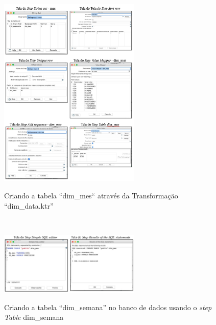 \begin{figure}[H]
	\vspace*{0,2cm}
    \centering
    \caption{Criando a tabela ``dim\_mes`` atrav\'{e}s da Transforma\c{c}\~{a}o ``dim\_data.ktr''}
    \includegraphics[width=0.6\textwidth]{./04-figuras/figura-dim-mes}
    \label{fig:ilustfigdimmes}
\end{figure}
\vspace*{-0,9cm}
{\raggedright {}} \\

\begin{figure}[H]
	\vspace*{0,2cm}
    \centering
    \caption{Criando a tabela ``dim\_semana'' no banco de dados usando o \textit{step Table} dim\_semana}
    \includegraphics[width=0.6\textwidth]{./04-figuras/figura-tb-dim-mes}
    \label{fig:ilustfigtbdimmes}
\end{figure}
\vspace*{-0,9cm}
{\raggedright {}} \\

